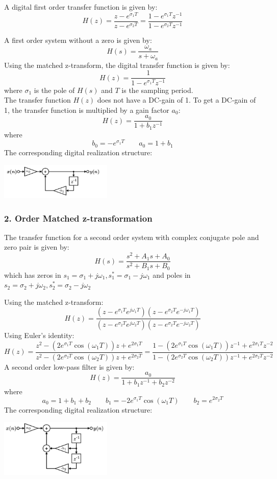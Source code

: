 A digital first order transfer function is given by:
$$H(z)={\frac{z-e^{\sigma_1 T}}{z-e^{\sigma_2 T}}}=\frac{1-e^{\sigma_1 T}z^{-1}}{1-e^{\sigma_2 T}z^{-1}}$$

A first order system without a zero is given by:
$$H(s)=\frac{\omega_a}{s+\omega_a}$$
Using the matched z-transform, the digital transfer function is given by:
$$H(z)=\frac{1}{1-e^{\sigma_1 T}z^{-1}}$$
where $\sigma_1$ is the pole of $H(s)$ and $T$ is the sampling period.\\
The transfer function $H(z)$ does not have a DC-gain of 1. To get a DC-gain of 1, the transfer function is multiplied by a gain factor $a_0$:
$$H(z)=\frac{a_0}{1+b_1z^{-1}}$$
where
$$b_0=-e^{\sigma_1 T} \qquad a_0=1+b_1$$
The corresponding digital realization structure:
\begin{center}
  \includegraphics[width=0.4\textwidth]{Images/Matched-z-1th.png}
\end{center}
\subsubsection{2. Order Matched z-transformation}
The transfer function for a second order system with complex conjugate pole and zero pair is given by:
$$H(s)={\frac{s^{2}+A_{1}s+A_{0}}{s^{2}+B_{1}s+B_{0}}}$$
which has zeros in $s_1=\sigma_1+j\omega_1,s_1^*=\sigma_1-j\omega_1$ and poles in $s_2=\sigma_2+j\omega_2,s_2^*=\sigma_2-j\omega_2$

Using the matched z-transform:
$$H(z)={\frac{(z-e^{\sigma_{1}T}e^{j\omega_{1}T})(z-e^{\sigma_{2}T}e^{-j\omega_{1}T})}{(z-e^{\sigma_{2}T}e^{j\omega_{2}T})(z-e^{\sigma_{2}T}e^{-j\omega_{2}T})}}$$
Using Euler's identity:
$$H(z)=\frac{z^{2}-(2e^{\sigma_{1}T}\cos(\omega_{1}T))z+e^{2\sigma_{1}T}}{z^{2}-(2e^{\sigma_{2}T}\cos(\omega_{2}T))z+e^{2\sigma_{2}T}}=\frac{1-(2e^{\sigma_{1}T}\cos(\omega_{1}T))z^{-1}+e^{2\sigma_{1}T}z^{-2}}{1-(2e^{\sigma_{2}T}\cos(\omega_{2}T))z^{-1}+e^{2\sigma_{2}T}z^{-2}}$$
A second order low-pass filter is given by:
$$H(z)=\frac{a_0}{1+b_1z^{-1}+b_2z^{-2}}$$
where
$$a_0=1+b_1+b_2 \qquad b_1=-2e^{\sigma_1 T}\cos(\omega_1 T) \qquad b_2=e^{2\sigma_2 T}$$
The corresponding digital realization structure:
\begin{center}
  \includegraphics[width=0.4\textwidth]{Images/Matched-z-2nd.png}
\end{center}
